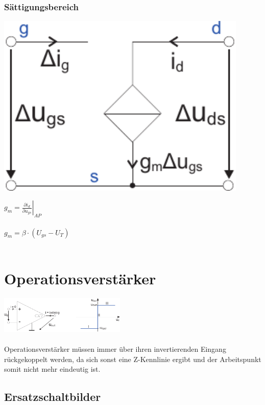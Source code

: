\documentclass[a4paper,twocolumn,10pt]{article}
\begin{document}
\subsubsection*{Sättigungsbereich}
\begin{minipage}[b]{0.25\textwidth}
\includegraphics[width=0.9\textwidth]{Grafiken/FET_KSE_sat}
\end{minipage}
\hfill
\begin{minipage}[b]{0.2\textwidth}
$g_m=\left.\frac{\partial i_d}{\partial u_{gs}}\right|_{AP}$\\\\
$g_m=\beta \cdot (U_{gs}-U_T)$\\\\
\end{minipage}

\section*{Operationsverstärker}
\includegraphics[width=0.45\textwidth]{Grafiken/OP}\\\\
Operationsverstärker müssen immer über ihren invertierenden Eingang rückgekoppelt werden, da sich sonst eine Z-Kennlinie ergibt und der Arbeitspunkt somit nicht mehr eindeutig ist.
\subsection*{Ersatzschaltbilder}
\end{document}
